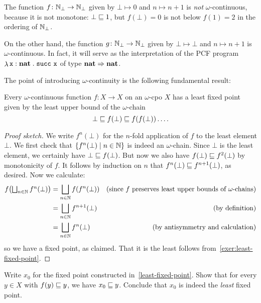 \begin{example}
  The function \(f \colon \mathbb N_\bot \to \mathbb N_\bot\) given by \(\bot \mapsto 0\)
  and \(n \mapsto n + 1\) is \emph{not} \(\omega\)-continuous, because it is not
  monotone: \(\bot \sqsubseteq 1\), but \(f(\bot) = 0\) is not below \(f(1) = 2\) in
  the ordering of \(\mathbb N_\bot\).

  On the other hand, the function \(g \colon \mathbb N_\bot \to \mathbb N_\bot\) given by
  \(\bot \mapsto \bot\) and \(n \mapsto n+1\) is \(\omega\)-continuous.
  In fact, it will serve as the interpretation of the PCF program
  \(\mathop{\lambda}{\mathtt x : \mathtt{\mathbf{nat}}}\mathrel{.}\operatorname{\mathtt{succ}}\,\mathtt x\) of type
  \(\mathtt{\mathbf{nat}} \Rightarrow \mathtt{\mathbf{nat}}\).
\end{example}

The point of introducing \(\omega\)-continuity is the following fundamental
result:

\begin{theorem}\label{least-fixed-point}
  Every \(\omega\)-continuous function \(f \colon X \to X\) on an \(\omega\)-cpo
  \(X\) has a least fixed point given by the least upper bound of the
  \(\omega\)-chain
  \[
    \bot \sqsubseteq f(\bot) \sqsubseteq f(f(\bot)) \dots.
  \]
\end{theorem}
\begin{proof}[Proof sketch]
  We write \(f^n(\bot)\) for the \(n\)-fold application of \(f\) to the least
  element \(\bot\).
  We first check that \(\{f^n(\bot) \mid n \in \mathbb N\}\) is indeed an
  \(\omega\)-chain.
  Since \(\bot\) is the least element, we certainly have
  \(\bot \sqsubseteq f(\bot)\). But now we also have \(f(\bot) \sqsubseteq f^2(\bot)\) by
  monotonicity of \(f\). It follows by induction on \(n\) that
  \(f^n(\bot) \sqsubseteq f^{n+1}(\bot)\), as desired.
  Now we calculate:
  \begin{align*}
    f\pa*{\textstyle\bigsqcup_{n \in \Nat}f^n(\bot)}
    &= \bigsqcup_{n \in \Nat}f\pa*{f^n(\bot)}
    &\text{(since \(f\) preserves least upper bounds of \(\omega\)-chains)} \\
    &= \bigsqcup_{n \in \Nat}f^{n+1}(\bot)
    &\text{(by definition)} \\
    &= \bigsqcup_{n \in \Nat}f^{n}(\bot)
    &\text{(by antisymmetry and calculation)}
  \end{align*}
  so we have a fixed point, as claimed. That it is the least follows
  from~\cref{exer:least-fixed-point}.
\end{proof}

\begin{exercise}\label{exer:least-fixed-point}
  Write \(x_0\) for the fixed point constructed in~\cref{least-fixed-point}.
  Show that for every \(y \in X\) with \(f(y) \sqsubseteq y\), we have \(x_0 \sqsubseteq y\).
  Conclude that \(x_0\) is indeed the \emph{least} fixed point.
\end{exercise}

